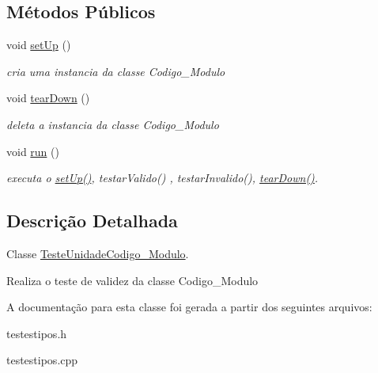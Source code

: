 \subsection*{\-Métodos \-Públicos}
\begin{DoxyCompactItemize}
\item 
\hypertarget{class_teste_unidade_codigo___modulo_ab9a7debd6cebfe5708b4f46d3e09878f}{
void \hyperlink{class_teste_unidade_codigo___modulo_ab9a7debd6cebfe5708b4f46d3e09878f}{set\-Up} ()}
\label{class_teste_unidade_codigo___modulo_ab9a7debd6cebfe5708b4f46d3e09878f}

\begin{DoxyCompactList}\small\item\em cria uma instancia da classe \-Codigo\-\_\-\-Modulo \end{DoxyCompactList}\item 
\hypertarget{class_teste_unidade_codigo___modulo_ac5663f6baabc9d3743d227d98d854f2d}{
void \hyperlink{class_teste_unidade_codigo___modulo_ac5663f6baabc9d3743d227d98d854f2d}{tear\-Down} ()}
\label{class_teste_unidade_codigo___modulo_ac5663f6baabc9d3743d227d98d854f2d}

\begin{DoxyCompactList}\small\item\em deleta a instancia da classe \-Codigo\-\_\-\-Modulo \end{DoxyCompactList}\item 
\hypertarget{class_teste_unidade_codigo___modulo_ab56267182e8bc291e100ac9acc0ef562}{
void \hyperlink{class_teste_unidade_codigo___modulo_ab56267182e8bc291e100ac9acc0ef562}{run} ()}
\label{class_teste_unidade_codigo___modulo_ab56267182e8bc291e100ac9acc0ef562}

\begin{DoxyCompactList}\small\item\em executa o \hyperlink{class_teste_unidade_codigo___modulo_ab9a7debd6cebfe5708b4f46d3e09878f}{set\-Up()}, testar\-Valido() , testar\-Invalido(), \hyperlink{class_teste_unidade_codigo___modulo_ac5663f6baabc9d3743d227d98d854f2d}{tear\-Down()}. \end{DoxyCompactList}\end{DoxyCompactItemize}


\subsection{\-Descrição \-Detalhada}
\-Classe \hyperlink{class_teste_unidade_codigo___modulo}{\-Teste\-Unidade\-Codigo\-\_\-\-Modulo}. 

\-Realiza o teste de validez da classe \-Codigo\-\_\-\-Modulo 

\-A documentação para esta classe foi gerada a partir dos seguintes arquivos\-:\begin{DoxyCompactItemize}
\item 
testestipos.\-h\item 
testestipos.\-cpp\end{DoxyCompactItemize}
